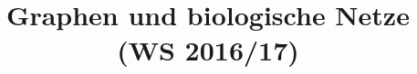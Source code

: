\documentclass[12pt,a4paper]{article}
\title{\Huge\textbf{Graphen und biologische Netze (WS 2016/17)}}
\author{}
\date{}
\begin{document}
\begin{titlepage}

\maketitle
\thispagestyle{empty}
\end{titlepage}
\newpage

\begin{titlepage}
\tableofcontents
\thispagestyle{empty}
\end{titlepage}
\newpage



\newpage



\newpage



\newpage



\newpage



\newpage



\newpage

%

\newpage



\newpage



\newpage



\newpage


\end{document}
